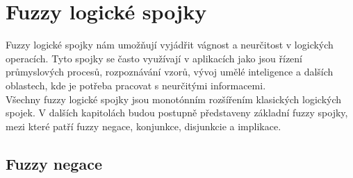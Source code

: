\begin{graph}
{
            }
\end{graph}



\section{Fuzzy logick\'e spojky}
Fuzzy logické spojky n\'am umožňují vyjádřit vágnost a neurčitost v logických operacích. Tyto spojky se často využívají v aplikacích jako jsou řízení průmyslových procesů, rozpoznávání vzorů, vývoj umělé inteligence a dalších oblastech, kde je potřeba pracovat s neurčitými informacemi.\\

V\v sechny fuzzy logick\'e spojky jsou monot\'onn\'im roz\v s\'i\v ren\'im klasick\'ych logick\'ych spojek. V dalších kapitolách budou postupně představeny základní fuzzy spojky, mezi kter\'e  patří 
fuzzy negace, konjunkce, disjunkcie a implikace. 

\subsection{Fuzzy negace}

